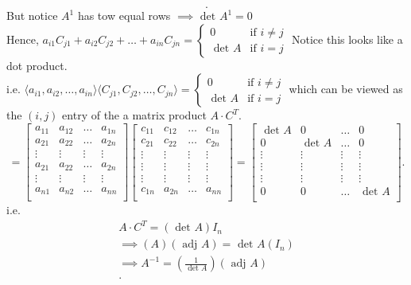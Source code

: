 \documentclass{report}
\begin{document}
{\[.\] 
But notice $ A^{1}$ has tow equal rows $ \implies \text{ det } A^{1}=0$                   \\
Hence, $ a_{i1} C_{j 1} + a_{i2} C_{j 2} + \ldots + a_{in} C_{j n} = \begin{cases}
        0 & \text{if } i\neq j \\
        \text{ det } A & \text{if } i=j
\end{cases} 
$
Notice this looks like a dot product.\\
i.e. $ \langle a_{ i 1}, a _{i 2}, \ldots , a_{ i n}  \rangle  \langle C_{ j 1 }, C_{ j 2}, \ldots , C_{ j n}  \rangle  =  \begin{cases}
        0 & \text{if } i\neq j \\
        \text{ det } A & \text{if } i=j
\end{cases}
$ 
which can be viewed as the $ \left( i,j \right) $  entry of the a matrix product $ A\cdot C^{T}$.
\[
= \begin{bmatrix}
a_{11} & a_{12} & \ldots & a_{1n}\\
a_{21} & a_{22} & \ldots & a_{2n}\\
\vdots & \vdots & \vdots & \vdots\\
a_{21} & a_{22} & \ldots & a_{2n}\\
\vdots & \vdots & \vdots & \vdots\\
 a_{ n1}& a_{ n 2} & \ldots & a_{ n n}\\
\end{bmatrix}      \begin{bmatrix}
c_{11} & c_{12} & \ldots & c_{1n}\\
c_{21} & c_{22} & \ldots & c_{2n}\\
\vdots & \vdots & \vdots & \vdots\\
\vdots & \vdots & \vdots & \vdots\\
\vdots & \vdots & \vdots & \vdots\\
 c_{ 1 n}& a_{ 2 n} & \ldots & a_{ n n}\\
\end{bmatrix} =      \begin{bmatrix}
\text{ det } A &  0& \ldots & 0\\
0 & \text{ det } A & \ldots & 0\\
\vdots & \vdots & \vdots & \vdots\\
\vdots & \vdots & \vdots & \vdots\\
\vdots & \vdots & \vdots & \vdots\\
 0& 0 & \ldots & \text{ det } A\\
\end{bmatrix} 
.\]      i.e. 
\begin{align*}
        A \cdot C^{T} = \left( \text{ det } A \right) I_n\\
        \implies \left( A \right) \left( \text{ adj } A \right) = \text{ det } A \left( I_n \right) \\
        \implies A^{-1} = \left( \frac{1}{ \text{ det } A} \right) \left( \text{ adj } A \right)\\
.\end{align*}
}


 
 
  



                                          
  
\end{document}
